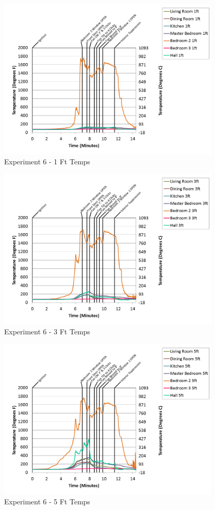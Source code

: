 \documentclass{article}
\begin{document}
\begin{appendices}
\begin{figure}[h!]
	\centering
	\includegraphics[height=3.05in]{0_Images/Results_Charts/Exp_6_Charts/1FtTemps.png}
	\caption{Experiment 6 - 1 Ft Temps}
\end{figure}


\begin{figure}[h!]
	\centering
	\includegraphics[height=3.05in]{0_Images/Results_Charts/Exp_6_Charts/3FtTemps.png}
	\caption{Experiment 6 - 3 Ft Temps}
\end{figure}

\clearpage

\begin{figure}[h!]
	\centering
	\includegraphics[height=3.05in]{0_Images/Results_Charts/Exp_6_Charts/5FtTemps.png}
	\caption{Experiment 6 - 5 Ft Temps}
\end{figure}



\end{appendices}
\end{document}

